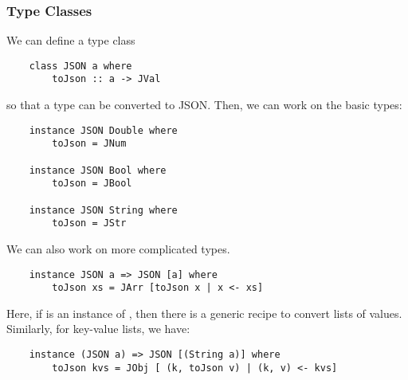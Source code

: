 \documentclass[letterpaper]{article}
\begin{document}
\subsubsection{Type Classes}
We can define a type class 
\begin{verbatim}
    class JSON a where 
        toJson :: a -> JVal \end{verbatim}
so that a type  can be converted to JSON. Then, we can work on the basic types: 
\begin{verbatim}
    instance JSON Double where 
        toJson = JNum

    instance JSON Bool where 
        toJson = JBool
    
    instance JSON String where 
        toJson = JStr\end{verbatim}
We can also work on more complicated types. 
\begin{verbatim}
    instance JSON a => JSON [a] where 
        toJson xs = JArr [toJson x | x <- xs]\end{verbatim}
Here, if  is an instance of , then there is a generic recipe to convert lists of  values. Similarly, for key-value lists, we have: 
\begin{verbatim}
    instance (JSON a) => JSON [(String a)] where 
        toJson kvs = JObj [ (k, toJson v) | (k, v) <- kvs]\end{verbatim}
\end{document}
